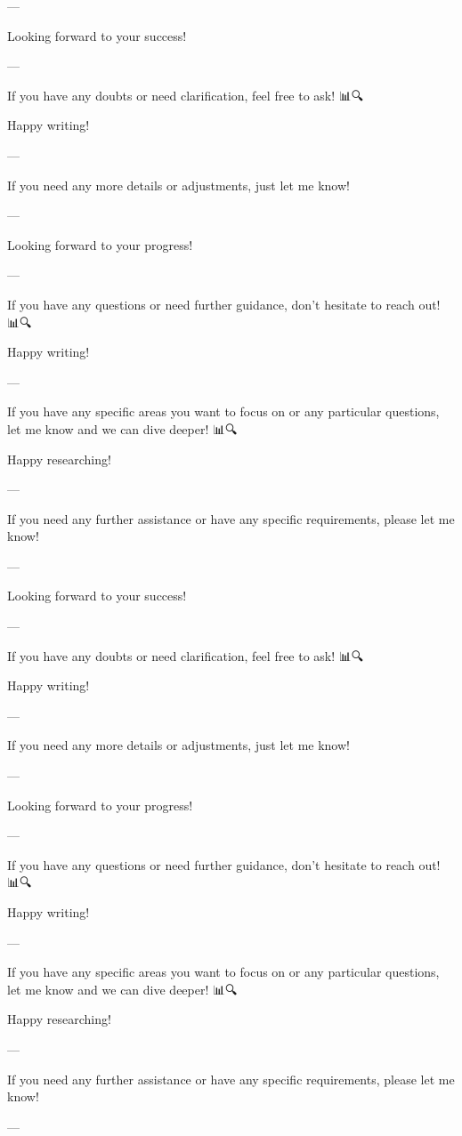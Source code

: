 --- 

Looking forward to your success! 🚀🌟

--- 

If you have any doubts or need clarification, feel free to ask! 📊🔍

Happy writing! 📝✨

--- 

If you need any more details or adjustments, just let me know! 🙌

--- 

Looking forward to your progress! 🚀🌟

--- 

If you have any questions or need further guidance, don't hesitate to reach out! 📊🔍

Happy writing! 📝✨

--- 

If you have any specific areas you want to focus on or any particular questions, let me know and we can dive deeper! 📊🔍

Happy researching! 📝🚀

--- 

If you need any further assistance or have any specific requirements, please let me know! 🙌

--- 

Looking forward to your success! 🚀🌟

--- 

If you have any doubts or need clarification, feel free to ask! 📊🔍

Happy writing! 📝✨

--- 

If you need any more details or adjustments, just let me know! 🙌

--- 

Looking forward to your progress! 🚀🌟

--- 

If you have any questions or need further guidance, don't hesitate to reach out! 📊🔍

Happy writing! 📝✨

--- 

If you have any specific areas you want to focus on or any particular questions, let me know and we can dive deeper! 📊🔍

Happy researching! 📝🚀

--- 

If you need any further assistance or have any specific requirements, please let me know! 🙌

--- 


